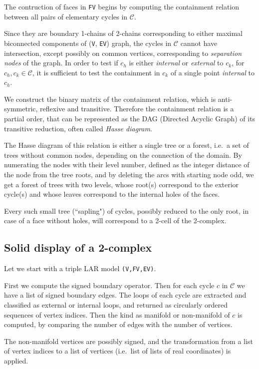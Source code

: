 \documentclass[11pt,oneside]{article}    %
\begin{document}
The contruction of faces in \texttt{FV} begins by computing the containment relation between all pairs of elementary cycles in $\mathcal{C}$.

Since they are boundary 1-chains of 2-chains corresponding to either maximal biconnected components of (\texttt{V}, \texttt{EV}) graph, the cycles in $\mathcal{C}$ cannot have intersection, except possibly on common vertices, corresponding to \emph{separation nodes} of the graph.
In order to test if $c_h$ is either \emph{internal} or \emph{external} to $c_k$, for $c_h, c_k \in \mathcal{C}$, it is sufficient to test the containment in $c_k$ of a single point \emph{internal} to $c_h$. 

We construct the binary matrix of the containment relation, which is anti-symmetric, reflexive and transitive.
Therefore the containment relation is a partial order, that can be represented as the DAG (Directed Acyclic Graph) of its transitive reduction,  often called \emph{Hasse diagram}.

The Hasse diagram of this relation is either a single tree or a forest, i.e.~a set of trees without common nodes, depending on the connection of the domain.
By numerating the nodes with their level number, defined as the integer distance of the node from the tree roots, and by deleting the arcs with starting node odd, we get a forest of trees with two levels, whose root(s) correspond to the exterior cycle(s) and whose leaves correspond to the internal holes of the faces.

Every such small tree (``sapling") of cycles, possibly reduced to the only root, in case of a face without holes, 
will correspond to a 2-cell of the 2-complex.


\subsection{Solid display of a 2-complex}

Let we start with a triple LAR model \texttt{(V,FV,EV)}.

First we compute the signed boundary operator. Then for each cycle $c$ in $\mathcal{C}$ we have a list of signed boundary edges. The loops of each cycle are extracted and classified as external or internal loops, and returned  as circularly ordered sequences of vertex indices.  Then the kind as manifold or non-manifold of $c$ is computed, by comparing the number of edges with the number of vertices. 

The non-manifold vertices are possibly signed, and the transformation from a list of vertex indices to a list of vertices (i.e.~list of lists of real coordinates) is applied.
\end{document}
